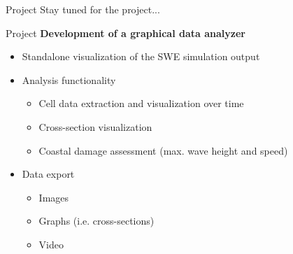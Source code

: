 \documentclass[shortpres,usenames,dvipsnames]{beamer}
\begin{document}
\begin{frame}{Project}
	\centering
	Stay tuned for the project...
\end{frame}

\begin{frame}{Project}
	\textbf{Development of a graphical data analyzer}
	\begin{itemize}
		\item Standalone visualization of the SWE simulation output
		\item Analysis functionality
		\begin{itemize}
			\item Cell data extraction and visualization over time
			\item Cross-section visualization
			\item Coastal damage assessment (max. wave height and speed)
		\end{itemize}
		\item Data export
		\begin{itemize}
			\item Images
			\item Graphs (i.e. cross-sections)
			\item Video
		\end{itemize}
	\end{itemize}
\end{frame}

\end{document}
